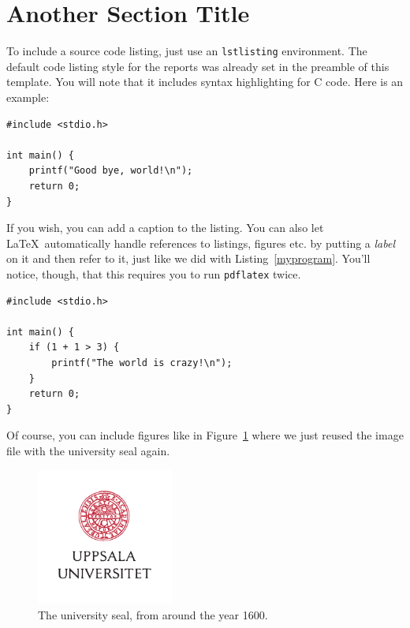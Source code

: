 \documentclass[oneside,a4paper]{article}
\begin{document}
\section{Another Section Title}

To include a source code listing, just use an {\tt lstlisting} environment. The default code listing style for the reports was already set in the preamble of this template. You will note that it includes syntax highlighting for C code. Here is an example:

\begin{lstlisting}
#include <stdio.h>

int main() {
	printf("Good bye, world!\n");
	return 0;
}
\end{lstlisting}

If you wish, you can add a caption to the listing. You can also let \LaTeX\ automatically handle references to listings, figures etc. by putting a \emph{label} on it and then refer to it, just like we did with Listing~\ref{myprogram}. You'll notice, though, that this requires you to run {\tt pdflatex} twice.

\begin{lstlisting}[caption={I'm very proud of this program}, label={myprogram}]
#include <stdio.h>

int main() {
	if (1 + 1 > 3) {
		printf("The world is crazy!\n");
	}
	return 0;
}
\end{lstlisting}

% 

Of course, you can include figures like in Figure~\ref{myfigure} where we just reused the image file with the university seal again.

\begin{figure}[h]
	\centering
	\includegraphics[width=0.4\textwidth]{UU_logo.pdf}
	\caption{The university seal, from around the year 1600.}
	\label{myfigure}
\end{figure}
\end{document}
